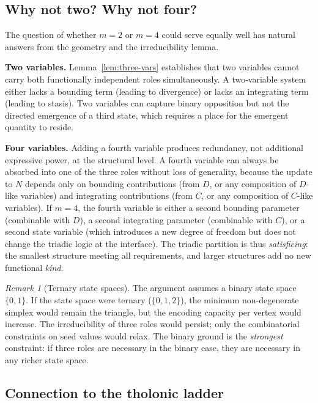 \documentclass[12pt]{article}
\theoremstyle{definition}
\theoremstyle{remark}
\newtheorem{remark}[theorem]{Remark}
\begin{document}
\subsection{Why not two? Why not four?}

The question of whether $m = 2$ or $m = 4$ could serve equally well has natural answers
from the geometry and the irreducibility lemma.

\textbf{Two variables.}  Lemma~\ref{lem:three-vars} establishes that two variables
cannot carry both functionally independent roles simultaneously.  A two-variable system
either lacks a bounding term (leading to divergence) or lacks an integrating term
(leading to stasis).  Two variables can capture binary opposition but not the directed
emergence of a third state, which requires a place for the emergent quantity to reside.

\textbf{Four variables.}  Adding a fourth variable produces redundancy, not additional
expressive power, at the structural level.  A fourth variable can always be absorbed
into one of the three roles without loss of generality, because the update to $N$
depends only on bounding contributions (from $D$, or any composition of $D$-like
variables) and integrating contributions (from $C$, or any composition of $C$-like
variables).  If $m = 4$, the fourth variable is either a second bounding parameter
(combinable with $D$), a second integrating parameter (combinable with $C$), or a
second state variable (which introduces a new degree of freedom but does not change the
triadic logic at the interface).  The triadic partition is thus \emph{satisficing}: the
smallest structure meeting all requirements, and larger structures add no new functional
\emph{kind}.

\begin{remark}[Ternary state spaces]\label{rem:ternary}
The argument assumes a binary state space $\{0,1\}$.  If the state space were ternary
($\{0,1,2\}$), the minimum non-degenerate simplex would remain the triangle, but the
encoding capacity per vertex would increase.  The irreducibility of three roles would
persist; only the combinatorial constraints on seed values would relax.  The binary
ground is the \emph{strongest} constraint: if three roles are necessary in the binary
case, they are necessary in any richer state space.
\end{remark}

\subsection{Connection to the tholonic ladder}
\end{document}
